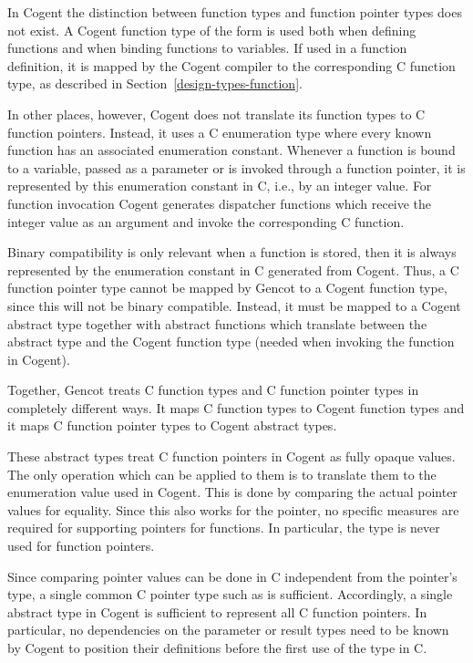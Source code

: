In Cogent the distinction between function types and function pointer types does not exist. 
A Cogent function type of the form  is used both when
defining functions and when binding functions to variables. If used in a function definition, it is mapped by
the Cogent compiler to the corresponding C function type, as described in Section~\ref{design-types-function}.

In other places, however, Cogent does not translate its function types to C function pointers. Instead, it uses 
a C enumeration type where every known function has an associated enumeration constant. Whenever a 
function is bound to a variable, passed as a parameter or is invoked through a function pointer, it is 
represented by this enumeration constant in C, i.e., by an integer value.
For function invocation Cogent generates dispatcher functions which receive the integer value as an argument
and invoke the corresponding C function. 

Binary compatibility is only relevant when a function is stored, then it is always represented by the enumeration
constant in C generated from Cogent. Thus, a C function pointer type cannot be mapped by Gencot to a Cogent function type,
since this will not be binary compatible. Instead, it must be mapped to a Cogent abstract type together with 
abstract functions which translate between the abstract type and the Cogent function type (needed when invoking 
the function in Cogent).

Together, Gencot treats C function types and C function pointer types in completely different ways. It maps
C function types to Cogent function types and it maps C function pointer types to Cogent abstract types.

These abstract types treat C function pointers in Cogent as fully opaque values. The only operation which can 
be applied to them is to translate them to the enumeration value used in Cogent. This is done by comparing the
actual pointer values for equality. Since this also works for the  pointer, no specific measures
are required for supporting  pointers for functions. In particular, the type  is never
used for function pointers.

Since comparing pointer values can be done in C independent from the pointer's type, a single 
common C pointer type such as  is sufficient. Accordingly, a single abstract type in Cogent is
sufficient to represent all C function pointers. In particular, no dependencies on the parameter or result types 
need to be known by Cogent to position their definitions before the first use of the type in C. 

